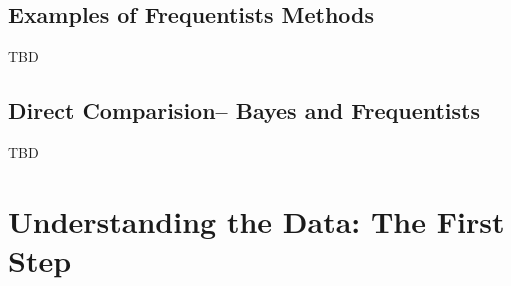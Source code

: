 \documentclass{article}\usepackage[]{graphicx}\usepackage[]{color}
\begin{document}
\subsection{Examples of Frequentists Methods}

TBD

\subsection{Direct Comparision-- Bayes and Frequentists}

TBD





\section{Understanding the Data: The First Step}
\end{document}
